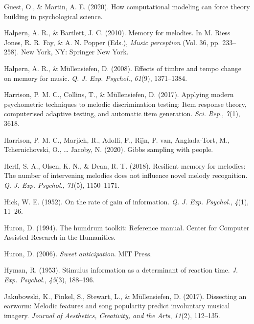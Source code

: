 \documentclass[english,man,floatsintext]{apa6}
\begin{document}
\leavevmode\hypertarget{ref-Guest2020-jx}{}%
Guest, O., \& Martin, A. E. (2020). How computational modeling can force theory building in psychological science.

\leavevmode\hypertarget{ref-Halpern2010-cz}{}%
Halpern, A. R., \& Bartlett, J. C. (2010). Memory for melodies. In M. Riess Jones, R. R. Fay, \& A. N. Popper (Eds.), \emph{Music perception} (Vol. 36, pp. 233--258). New York, NY: Springer New York.

\leavevmode\hypertarget{ref-Halpern2008-vh}{}%
Halpern, A. R., \& Müllensiefen, D. (2008). Effects of timbre and tempo change on memory for music. \emph{Q. J. Exp. Psychol.}, \emph{61}(9), 1371--1384.

\leavevmode\hypertarget{ref-Harrison2017-us}{}%
Harrison, P. M. C., Collins, T., \& Müllensiefen, D. (2017). Applying modern psychometric techniques to melodic discrimination testing: Item response theory, computerised adaptive testing, and automatic item generation. \emph{Sci. Rep.}, \emph{7}(1), 3618.

\leavevmode\hypertarget{ref-harrison2020gibbs}{}%
Harrison, P. M. C., Marjieh, R., Adolfi, F., Rijn, P. van, Anglada-Tort, M., Tchernichovski, O., \ldots{} Jacoby, N. (2020). Gibbs sampling with people.

\leavevmode\hypertarget{ref-Herff2018-ts}{}%
Herff, S. A., Olsen, K. N., \& Dean, R. T. (2018). Resilient memory for melodies: The number of intervening melodies does not influence novel melody recognition. \emph{Q. J. Exp. Psychol.}, \emph{71}(5), 1150--1171.

\leavevmode\hypertarget{ref-Hick1952-mj}{}%
Hick, W. E. (1952). On the rate of gain of information. \emph{Q. J. Exp. Psychol.}, \emph{4}(1), 11--26.

\leavevmode\hypertarget{ref-Huron1994-gt}{}%
Huron, D. (1994). The humdrum toolkit: Reference manual. Center for Computer Assisted Research in the Humanities.

\leavevmode\hypertarget{ref-Huron2006-ly}{}%
Huron, D. (2006). \emph{Sweet anticipation}. MIT Press.

\leavevmode\hypertarget{ref-Hyman1953-xw}{}%
Hyman, R. (1953). Stimulus information as a determinant of reaction time. \emph{J. Exp. Psychol.}, \emph{45}(3), 188--196.

\leavevmode\hypertarget{ref-Jakubowski2017-pz}{}%
Jakubowski, K., Finkel, S., Stewart, L., \& Müllensiefen, D. (2017). Dissecting an earworm: Melodic features and song popularity predict involuntary musical imagery. \emph{Journal of Aesthetics, Creativity, and the Arts}, \emph{11}(2), 112--135.
\end{document}
